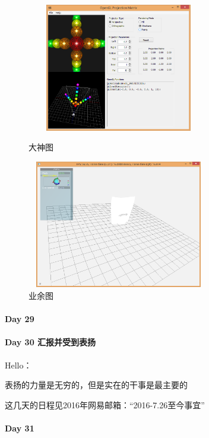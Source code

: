 \documentclass[UTF8,a4paper,8pt]{ctexbook}
\begin{document}
		 \begin{figure}
		 	\begin{center}
		 		\begin{minipage}[H]{0.5\textwidth}
		 			\centering
		 			\includegraphics[angle=0,width=8cm,height=5.6cm]{good2.png}%
		 			\caption{大神图}
		 			\label{fig:Good2}
		 		\end{minipage}%
		 		\begin{minipage}[H]{0.5\textwidth} 
		 			\centering
		 			\includegraphics[angle=0,width=8cm,height=5.6cm]{bad2.png}
		 			\caption{业余图 }
		 			\label{fig:Bad2}
		 		\end{minipage}
		 	\end{center}
		 \end{figure}		 
 	 \paragraph{Day 29      \quad     }   
 	 \paragraph{Day 30  汇报并受到表扬    \quad     }Hello：
 	 
	 	 表扬的力量是无穷的，但是实在的干事是最主要的
	 	 
	 	 这几天的日程见2016年网易邮箱：“2016-7.26至今事宜”
 	 \paragraph{Day 31      \quad     }
\end{document}
